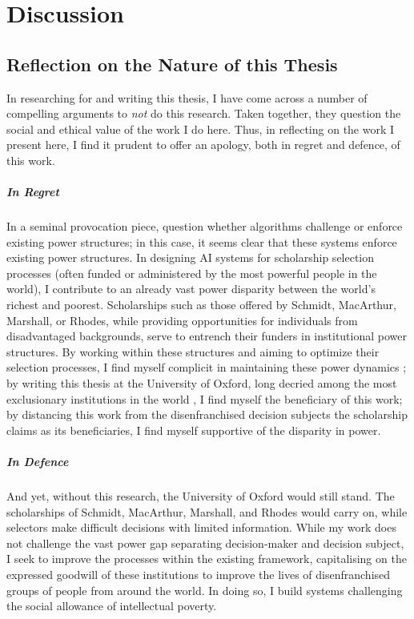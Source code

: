 \chapter{\label{ch:discussion}Discussion}

\minitoc

\section{Reflection on the Nature of this Thesis}
In researching for and writing this thesis, I have come across a number of compelling arguments to \emph{not} do this research. Taken together, they question the social and ethical value of the work I do here. Thus, in reflecting on the work I present here, I find it prudent to offer an apology, both in regret and defence, of this work.

\paragraph{In Regret}
In a seminal provocation piece, \textcite{Barocas_Hood_Ziewitz_2013} question whether algorithms challenge or enforce existing power structures; in this case, it seems clear that these systems enforce existing power structures. In designing AI systems for scholarship selection processes (often funded or administered by the most powerful people in the world), I contribute to an already vast power disparity between the world's richest and poorest. Scholarships such as those offered by Schmidt, MacArthur, Marshall, or Rhodes, while providing opportunities for individuals from disadvantaged backgrounds, serve to entrench their funders in institutional power structures. By working within these structures and aiming to optimize their selection processes, I find myself complicit in maintaining these power dynamics \cite{Ziegler_2008}; by writing this thesis at the University of Oxford, long decried among the most exclusionary institutions in the world \cite{Ziegler_2008}, I find myself the beneficiary of this work; by distancing this work from the disenfranchised decision subjects the scholarship claims as its beneficiaries, I find myself supportive of the disparity in power. 

\paragraph{In Defence}
And yet, without this research, the University of Oxford would still stand. The scholarships of Schmidt, MacArthur, Marshall, and Rhodes would carry on, while selectors make difficult decisions with limited information. While my work does not challenge the vast power gap separating decision-maker and decision subject, I seek to improve the processes within the existing framework, capitalising on the expressed goodwill of these institutions to improve the lives of disenfranchised groups of people from around the world. In doing so, I build systems challenging the social allowance of intellectual poverty.

